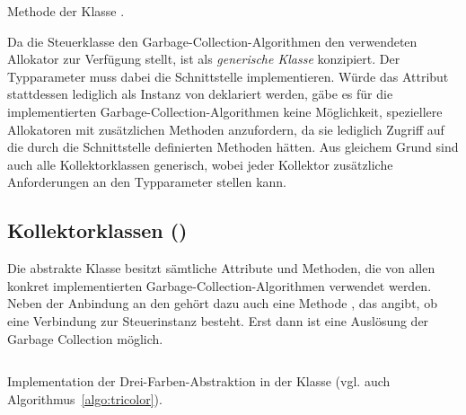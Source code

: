 \begin{listing}[h]
	\inputminted[]{java}{code/Controller-collect.java}
	\caption[Methode  der Klasse ]{Methode  der Klasse .}
	\label{java:controller-collect}
\end{listing}

Da die Steuerklasse den Garbage-Collection-Algorithmen den verwendeten Allokator zur Verfügung stellt, ist  als \textit{generische Klasse} konzipiert.
Der Typparameter  muss dabei die Schnittstelle  implementieren.
Würde das Attribut  stattdessen lediglich als Instanz von  deklariert werden, gäbe es für die implementierten Garbage-Collection-Algorithmen keine Möglichkeit, speziellere Allokatoren mit zusätzlichen Methoden anzufordern, da sie lediglich Zugriff auf die durch die Schnittstelle definierten Methoden hätten.
Aus gleichem Grund sind auch alle Kollektorklassen generisch, wobei jeder Kollektor zusätzliche Anforderungen an den Typparameter stellen kann.

\subsection{Kollektorklassen ()}
\label{sub:impl-gc}
Die abstrakte Klasse  besitzt sämtliche Attribute und Methoden, die von allen konkret implementierten Garbage-Collection-Algorithmen verwendet werden.
Neben der Anbindung an den  gehört dazu auch eine Methode , das angibt, ob eine Verbindung zur Steuerinstanz besteht.
Erst dann ist eine Auslösung der Garbage Collection möglich.

\begin{listing}[t!]
	\inputminted[]{java}{code/MarkSweep-core.java}
	\caption[Implementation der Drei-Farben-Abstraktion]{Implementation der Drei-Farben-Abstraktion in der Klasse  (vgl. auch Algorithmus~\ref{algo:tricolor}).}
	\label{java:tricolor-core}
\end{listing}

